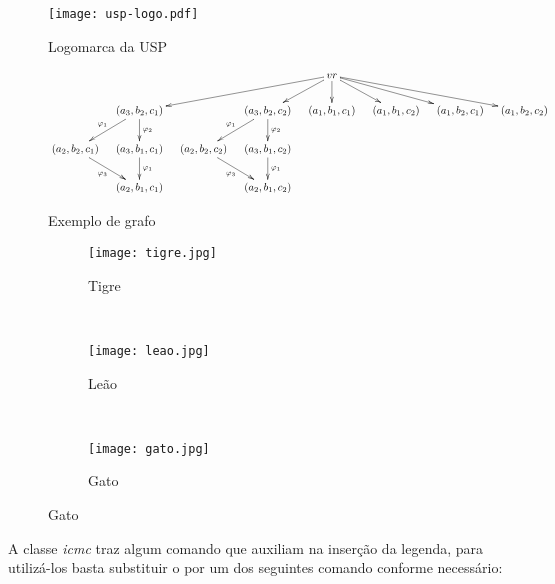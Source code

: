 \begin{figure}[htb]
 \caption{Logomarca da USP}
 \label{fig:logomarca_usp}
 \centering
 \texttt{[image: usp-logo.pdf]}
\end{figure}


\begin{figure}[htb]
\caption{Exemplo de grafo}
\label{figura:exemplo_grafo}
\centering
\begin{scriptsize}
$$
\xymatrix@R20pt@C10pt{
 & & & & vr \ar[dlll] \ar[dl] \ar[d] \ar[dr] \ar[drr] \ar[drrr] & & & \\
 & (a_3, b_2, c_1) \ar[d]^{\varphi_2} \ar[dl]_{\varphi_1} & & (a_3, b_2, c_2) \ar[d]^{\varphi_2} \ar[dl]_{\varphi_1} & (a_1, b_1, c_1) & (a_1, b_1, c_2) & (a_1, b_2, c_1) & (a_1, b_2, c_2) \\
 (a_2, b_2, c_1) \ar[dr]_{\varphi_3} & (a_3, b_1, c_1) \ar[d]^{\varphi_1} & (a_2, b_2, c_2) \ar[dr]_{\varphi_3} & (a_3, b_1, c_2) \ar[d]^{\varphi_1} & & & & \\
& (a_2, b_1, c_1)  & & (a_2, b_1, c_2) & & & & \\
}
$$
\end{scriptsize}
\fautor
\end{figure}

\begin{figure}[htb] 
    \centering 
    \caption{Figuras de animaisPictures of animals}\label{fig:animals} 
    \begin{subfigure}[b]{0.317\textwidth} 
        \texttt{[image: tigre.jpg]} 
        \caption{Tigre} 
        \label{fig:tigre} 
    \end{subfigure} ~ %
    \begin{subfigure}[b]{0.317\textwidth} 
        \texttt{[image: leao.jpg]} 
        \caption{Leão} \label{fig:leao} 
    \end{subfigure} ~ %
    \begin{subfigure}[b]{0.317\textwidth} 
        \texttt{[image: gato.jpg]} 
        \caption{Gato} \label{fig:gato} 
    \end{subfigure}
    \fautor
\end{figure}

A classe \textit{icmc} traz algum comando que auxiliam na inserção da legenda, para utilizá-los basta substituir o  por um dos seguintes comando conforme necessário:

